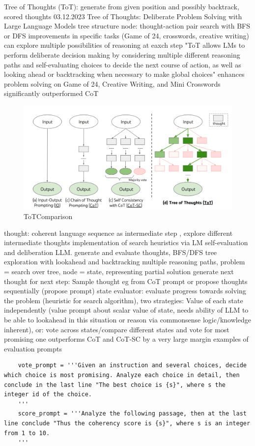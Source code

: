 \documentclass{article}
\begin{document}
Tree of Thoughts (ToT): generate from given position and possibly backtrack, scored thoughts \cite{yao_tree_2023} 03.12.2023 Tree of Thoughts: Deliberate Problem Solving with Large Language Models
tree structure
node: thought-action pair
search with BFS or DFS
improvements in specific tasks (Game of 24, crosswords, creative writing)
can explore multiple possibilities of reasoning at eaxch step
"ToT allows LMs to perform deliberate decision making by considering multiple different reasoning paths and self-evaluating choices to decide the next course of action, as well as looking ahead or backtracking when necessary to make global choices"
enhances problem solving on Game of 24, Creative Writing, and Mini Crosswords
significantly outperformed CoT
\begin{figure}[h]
	\centering
	\includegraphics[width=0.7\linewidth]{ToTComparison.png}
	\caption{ToTComparison \cite{yao_tree_2023}}
	\label{fig:totcomparison}
\end{figure}
thought: coherent language sequence as intermediate step , explore different intermediate thoughts
implementation of search heuristics via LM self-evaluation and deliberation
LLM. generate and evaluate thoughts, BFS/DFS tree exploration with lookahead and backtracking
multiple reasoning paths, problem = search over tree, node = state, representing partial solution
generate next thought for next step:
Sample thought eg from CoT prompt or propose thoughts sequentially (propose prompt)
state evaluator: evaluate progress towards solving the problem (heuristic for search algorithm), two strategies: Value of each state independently (value prompt about scalar value of state, needs ability of LLM to be able to lookahead in this situation or reason via commonsense logic/knowledge inherent), or: vote across states/compare different states and vote for most promising one
outperforms CoT and CoT-SC by a very large margin
examples of evaluation prompts
\begin{verbatim}
	vote_prompt = '''Given an instruction and several choices, decide which choice is most promising. Analyze each choice in detail, then conclude in the last line "The best choice is {s}", where s the integer id of the choice.
	'''
	score_prompt = '''Analyze the following passage, then at the last line conclude "Thus the coherency score is {s}", where s is an integer from 1 to 10.
	'''
\end{verbatim}
\end{document}
